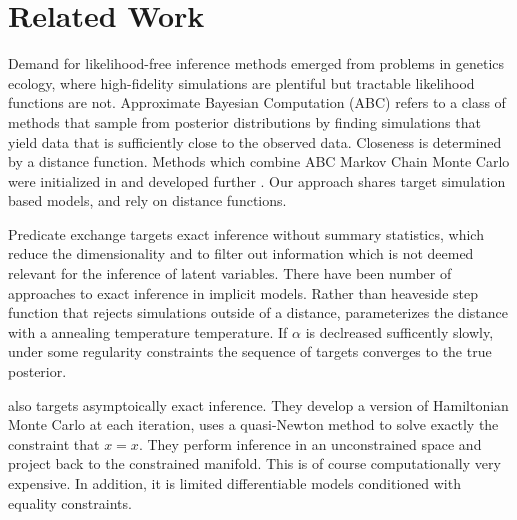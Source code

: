 \section{Related Work}

Demand for likelihood-free inference methods emerged from problems in genetics ecology, where high-fidelity simulations are plentiful but tractable likelihood functions are not.
Approximate Bayesian Computation (ABC) refers to a class of methods \cite{beaumont2002approximate,sisson2007sequential} that sample from posterior distributions by finding simulations that yield data that is sufficiently close to the observed data.
Closeness is determined by a distance function.
Methods which combine ABC Markov Chain Monte Carlo were initialized in \cite{marjoram2003markov} and developed further \cite{wegmann2009efficient}.
Our approach shares target simulation based models, and rely on distance functions.

Predicate exchange targets exact inference without summary statistics, which reduce the dimensionality and to filter out information which is not deemed relevant for the inference of latent variables.
There have been number of approaches to exact inference in implicit models.
Rather than heaveside step function that rejects simulations outside of a distance, \cite{albert2015simulated} parameterizes the distance with a annealing temperature temperature.  If $\alpha$ is declreased sufficently slowly, under some regularity constraints the sequence of targets converges to the true posterior.

\cite{graham2017asymptotically} also targets asymptoically exact inference.
They develop a version of Hamiltonian Monte Carlo at each iteration, uses a quasi-Newton method to solve exactly the constraint that $x = x$.  They perform inference in an unconstrained space and project back to the constrained manifold.
This is of course computationally very expensive.
In addition, it is limited differentiable models conditioned with equality constraints. 


